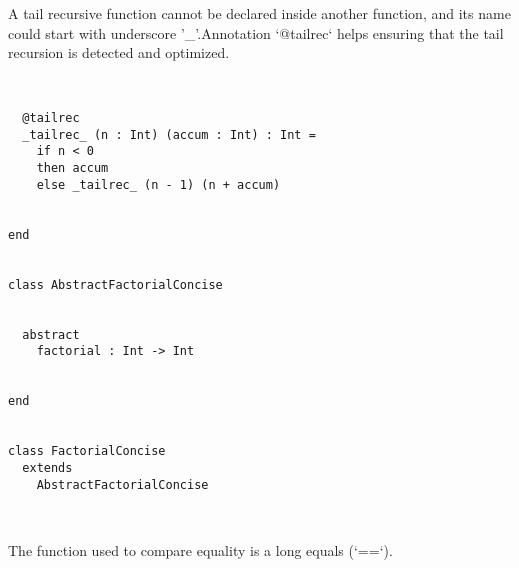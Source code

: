 A tail recursive function cannot be declared inside another function, and its name could start with underscore '_'.Annotation `@tailrec` helps ensuring that the tail recursion is detected and optimized. 


\begin{lstlisting}


  @tailrec
  _tailrec_ (n : Int) (accum : Int) : Int =
    if n < 0
    then accum
    else _tailrec_ (n - 1) (n + accum)


end


class AbstractFactorialConcise


  abstract
    factorial : Int -> Int


end


class FactorialConcise
  extends
    AbstractFactorialConcise



\end{lstlisting}

The function used to compare equality is a long equals (`==`). 


